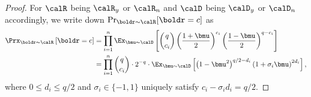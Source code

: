 \begin{proof}
 For $\calR$ being $\calR_y$ or $\calR_n$ and $\calD$ being $\calD_y$ or $\calD_n$
   accordingly, 
   we write down $\Pr_{\boldr\sim \calR} [\boldr=c]$ as
   \begin{align*}
        \Prx_{\boldr \sim \calR}\left[ \boldr = c\right] &= \prod_{i=1}^n \Ex_{\bmu \sim \calD}\left[ \binom{q}{c_i} \left(\frac{1 + \bmu}{2}\right)^{c_i} \left( \frac{1 - \bmu}{2} \right)^{q-c_i} \right] \\
                        &= \prod_{i=1}^n \binom{q}{c_i} \cdot 2^{-q} \cdot \Ex_{\bmu \sim \calD}\left[ \left(1 - \bmu^2 \right)^{q/2 - d_i} \left(1+ \sigma_i \bmu \right)^{2 d_i} \right],
    \end{align*}
where $0\le d_i\le q/2$ and $\sigma_i \in \{-1,1\}$ uniquely satisfy $c_i - \sigma_i d_i = q/2$.


\end{proof}
